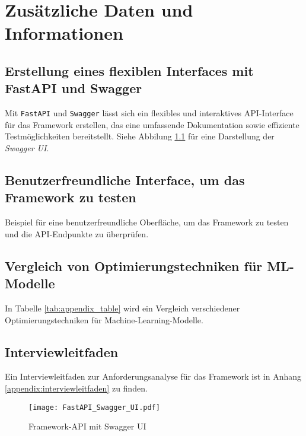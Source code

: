 
\chapter{Zusätzliche Daten und Informationen}
\label{appendix_a}

\section{Erstellung eines flexiblen Interfaces mit FastAPI und Swagger}

Mit \texttt{FastAPI} und \texttt{Swagger} lässt sich ein flexibles und interaktives API-Interface für das 
Framework erstellen, das eine umfassende Dokumentation sowie effiziente Testmöglichkeiten bereitstellt.
Siehe Abbilung \ref{fig:Swagger_UI} für eine Darstellung der \textit{Swagger UI}.

\section{Benutzerfreundliche Interface, um das Framework zu testen}

Beispiel für eine benutzerfreundliche Oberfläche, um das Framework zu testen und die API-Endpunkte zu überprüfen.

\section{Vergleich von Optimierungstechniken für ML-Modelle}

In Tabelle \ref{tab:appendix_table} wird ein Vergleich verschiedener Optimierungstechniken für Machine-Learning-Modelle.

\section{Interviewleitfaden}

Ein Interviewleitfaden zur Anforderungsanalyse für das Framework ist in Anhang \ref{appendix:interviewleitfaden} zu finden.

\begin{figure}[h!]
    \centering
    \texttt{[image: FastAPI\_Swagger\_UI.pdf]} 
    \caption{Framework-API mit Swagger UI} 
    \label{fig:Swagger_UI} 
\end{figure}


